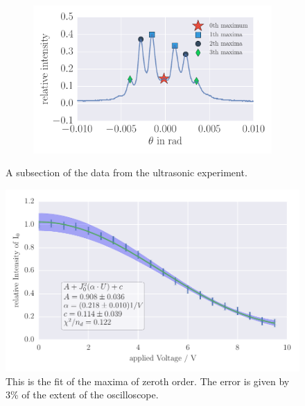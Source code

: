 \begin{figure}
\begin{subfigure}[b]{\picwidth}
        \caption{}
        \label{fig:raman_014}
    \end{subfigure}
    \begin{subfigure}[b]{\picwidth}
        \includegraphics[width=1.0\textwidth]{analysis/figures/raman_020}
        \caption{}
        \label{fig:raman_020}
    \end{subfigure}
    \caption{A subsection of the data from the ultrasonic experiment.}\label{fig:raman}
\end{figure}
\begin{figure}[htpb]
    \centering
    \includegraphics[width=1\textwidth]{analysis/figures/besselfit_000}
    \caption{This is the fit of the maxima of zeroth order. The error is given by 3\% of the extent of the oscilloscope.}
    \label{fig:besselfit_000}
\end{figure}

